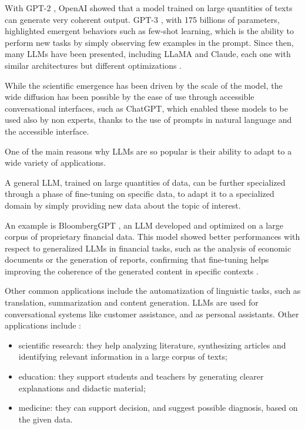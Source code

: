\medskip
With GPT-2 \cite{radford2019language}, OpenAI showed that a model trained on large quantities of texts can generate very coherent output.
GPT-3 \cite{brown2020LMfewshot}, with 175 billions of parameters, highlighted emergent behaviors such as few-shot learning, which is the ability to perform new tasks by simply observing few examples in the prompt.
Since then, many LLMs have been presented, including LLaMA and Claude, each one with similar architectures but different optimizations \cite{wang2025llm}.

While the scientific emergence has been driven by the scale of the model, the wide diffusion has been possible by the ease of use through accessible conversational interfaces, such as ChatGPT, which enabled these models to be used also by non experts, thanks to the use of prompts in natural language and the accessible interface.

\medskip
One of the main reasons why LLMs are so popular is their ability to adapt to a wide variety of applications.

A general LLM, trained on large quantities of data, can be further specialized through a phase of fine-tuning on specific data, to adapt it to a specialized domain by simply providing new data about the topic of interest.

An example is BloombergGPT \cite{wu2023bloomberggptlargelanguagemodel}, an LLM developed and optimized on a large corpus of proprietary financial data. This model showed better performances with respect to generalized LLMs in financial tasks, such as the analysis of economic documents or the generation of reports, confirming that fine-tuning helps improving the coherence of the generated content in specific contexts \cite{wang2025llm}.

\medskip
Other common applications include the automatization of linguistic tasks, such as translation, summarization and content generation. LLMs are used for conversational systems like customer assistance, and as personal assistants.
Other applications include \cite{wang2025llm}:
\begin{itemize}
    \item scientific research: they help analyzing literature, synthesizing articles and identifying relevant information in a large corpus of texts;
    \item education: they support students and teachers by generating clearer explanations and didactic material;
    \item medicine: they can support decision, and suggest possible diagnosis, based on the given data.
\end{itemize}

